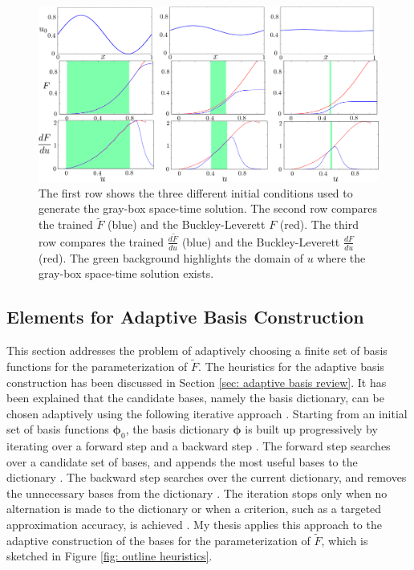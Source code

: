 \begin{figure}[htbp]
\begin{center}
    \includegraphics[width=16cm]{../combine_3_inits.png}
    \caption{The first row shows the three different initial conditions used to generate
             the gray-box space-time solution. The second row compares the trained $\tilde{F}$ 
             (blue) and the Buckley-Leverett $F$ (red). The third row compares
             the trained $\frac{d\tilde{F}}{du}$ (blue) and the Buckley-Leverett 
             $\frac{dF}{du}$ (red). The green background highlights the domain of $u$ where
             the gray-box space-time solution exists.}
    \label{fig: combine 3}
\end{center}
\end{figure}


\subsection{Elements for Adaptive Basis Construction}
\label{sec: adaptive basis}
This section addresses the problem of adaptively choosing a finite set of basis functions
for the parameterization of $\tilde{F}$.
The heuristics for the adaptive basis construction has been discussed in Section
\ref{sec: adaptive basis review}. It has been explained that the candidate bases, namely the basis
dictionary, can be chosen adaptively using 
the following iterative approach \cite{adaptive basis 1, adaptive basis 2, adaptive basis 3}. 
Starting from an initial set of basis functions $\boldsymbol{\phi}_0$,
the basis dictionary $\boldsymbol{\phi}$ is built up progressively 
by iterating over a forward step and a backward step
\cite{adaptive basis 1, adaptive basis 2, adaptive basis 3}.
The forward step searches over a candidate set of bases, and appends the most useful bases 
to the dictionary
\cite{adaptive basis 1, adaptive basis 2, adaptive basis 3}.
The backward step searches over the current dictionary, and removes the 
unnecessary bases from the dictionary
\cite{adaptive basis 1, adaptive basis 2, adaptive basis 3}.
The iteration stops only when no alternation is made to the dictionary or when a criterion, such
as a targeted approximation accuracy,
is achieved \cite{adaptive basis 1, adaptive basis 2, adaptive basis 3}. My thesis applies 
this approach to the adaptive construction of the bases for the parameterization of $\tilde{F}$,
which is sketched in Figure \ref{fig: outline heuristics}.\\

